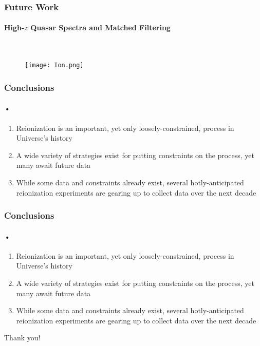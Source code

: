 \documentclass{beamer}
\begin{document}
\begin{frame}
\frametitle{Future Work}
\framesubtitle{High-$z$ Quasar Spectra and Matched Filtering}
\ \ \ \ \ 
\begin{flushleft}
\begin{figure}
  \texttt{[image: Ion.png]}
\end{figure}
\end{flushleft}
\end{frame}

\begin{frame}
\frametitle{Conclusions}
\framesubtitle{•}
\begin{enumerate}[-]
\item Reionization is an important, yet only loosely-constrained, process in Universe's history
\item A wide variety of strategies exist for putting constraints on the process, yet many await future data
\item While some data and constraints already exist, several hotly-anticipated reionization experiments are gearing up to collect data over the next decade
\end{enumerate}
\end{frame}

\begin{frame}
\frametitle{Conclusions}
\framesubtitle{•}
\begin{enumerate}[-]
\item Reionization is an important, yet only loosely-constrained, process in Universe's history
\item A wide variety of strategies exist for putting constraints on the process, yet many await future data
\item While some data and constraints already exist, several hotly-anticipated reionization experiments are gearing up to collect data over the next decade
\end{enumerate}
\begin{center}
{\LARGE Thank you!}
\end{center}
\end{frame}

\end{document}
